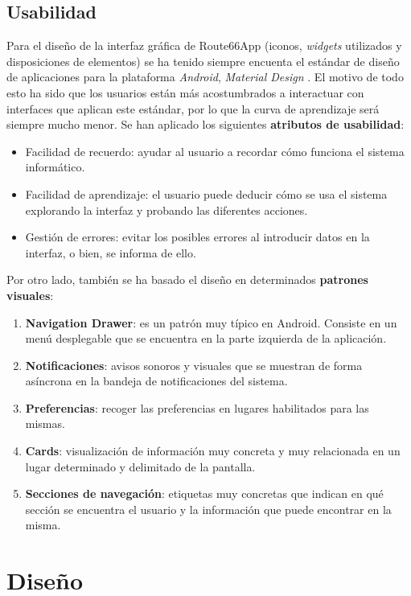 \documentclass[twoside]{report}
\begin{document}
\subsection{Usabilidad}
\label{usabilitymatters}

Para el diseño de la interfaz gráfica de Route66App (iconos, \textit{widgets} utilizados y disposiciones de elementos) se ha tenido siempre encuenta el estándar de diseño de aplicaciones para la plataforma \textit{Android}, 	\textit{Material Design} \cite{materialil} \cite{materialdocs}. El motivo de todo esto ha sido que los usuarios están más acostumbrados a interactuar con interfaces que aplican este estándar, por lo que la curva de aprendizaje será siempre mucho menor. Se han aplicado los siguientes \textbf{atributos de usabilidad}:

\begin{itemize}
\item Facilidad de recuerdo: ayudar al usuario a recordar cómo funciona el sistema informático.
\item Facilidad de aprendizaje: el usuario puede deducir cómo se usa el sistema explorando la interfaz y probando las diferentes acciones.
\item Gestión de errores: evitar los posibles errores al introducir datos en la interfaz, o bien, se informa de ello.
\end{itemize}

Por otro lado, también se ha basado el diseño en determinados \textbf{patrones visuales}:
\begin{enumerate}
	\item \textbf{Navigation Drawer}: es un patrón muy típico en Android. Consiste en un menú desplegable que se encuentra en la parte izquierda de la aplicación.
	\item \textbf{Notificaciones}: avisos sonoros y visuales que se muestran de forma asíncrona en la bandeja de notificaciones del sistema.
	\item \textbf{Preferencias}: recoger las preferencias en lugares habilitados para las mismas.
	\item \textbf{Cards}: visualización de información muy concreta y muy relacionada en un lugar determinado y delimitado de la pantalla.
	\item \textbf{Secciones de navegación}: etiquetas muy concretas que indican en qué sección se encuentra el usuario y la información que puede encontrar en la misma.
\end{enumerate}


\section{Diseño}
\end{document}
